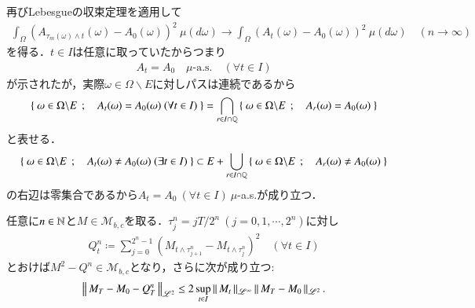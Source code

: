 \begin{prf}
		再びLebesgueの収束定理を適用して
		\begin{align}
			\int_\Omega \left( A_{\tau_m(\omega) \wedge t}(\omega) - A_{0}(\omega) \right)^2\ \mu(d\omega)
			\longrightarrow \int_\Omega \left( A_t(\omega) - A_{0}(\omega) \right)^2\ \mu(d\omega) \quad (n \longrightarrow \infty)
		\end{align}
		を得る．$t \in I$は任意に取っていたからつまり
		\begin{align}
			A_t = A_0 \quad \mbox{$\mu$-a.s.} \quad (\forall t \in I)
		\end{align}
		が示されたが，実際$\omega \in \Omega \backslash E$に対しパスは連続であるから
		\begin{align}
			\left\{\ \omega \in \Omega \backslash E\ \, ; \quad A_t(\omega) = A_0(\omega)\ (\forall t \in I)\ \right\}
			= \bigcap_{r \in I \cap \mathbb{Q}} \left\{\ \omega \in \Omega \backslash E\ \, ; \quad A_r(\omega) = A_0(\omega)\ \right\}
		\end{align}
		と表せる．
		\begin{align}
			\left\{\ \omega \in \Omega \backslash E\ \, ; \quad A_t(\omega) \neq A_0(\omega)\ (\exists t \in I)\ \right\}
			\subset E + \bigcup_{r \in I \cap \mathbb{Q}} \left\{\ \omega \in \Omega \backslash E\ \, ; \quad A_r(\omega) \neq A_0(\omega)\ \right\}
		\end{align}
		の右辺は零集合であるから$A_t = A_0\ (\forall t \in I)\ $$\mu$-a.s.が成り立つ．
		\QED
	\end{prf}
	
	\begin{itembox}[l]{}
		\begin{lem}[二次変分補題]
			任意に$n \in \mathbb{N}$と$M \in \mathcal{M}_{b,c}$を取る．$\tau_j^n = jT/2^n\ (j=0,1,\cdots,2^n)$に対し
			\begin{align}
				Q_t^n \coloneqq \sum_{j=0}^{2^n-1} \left( M_{t \wedge \tau_{j+1}^n} - M_{t \wedge \tau_j^n} \right)^2 \quad (\forall t \in I)
				\label{eq:lem_quadratic_variation_0}
			\end{align}
			とおけば$M^2 - Q^n \in \mathcal{M}_{b,c}$となり，さらに次が成り立つ:
			\begin{align}
				\left\|\, M_T - M_0 - Q_T^n\, \right\|_{\mathscr{L}^2} \leq 2 \operatorname*{sup}_{t \in I} \left\|\, M_t\, \right\|_{\mathscr{L}^\infty} \left\|\, M_T - M_0\, \right\|_{\mathscr{L}^2}.
			\end{align}
			\label{lem:quadratic_variation}
		\end{lem}
	\end{itembox}
	
